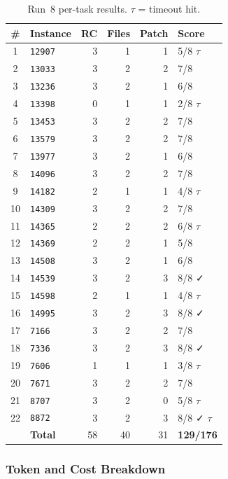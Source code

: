 \begin{table}[h]
\centering
\small
\caption{Run~8 per-task results.  $\tau$ = timeout hit.}\label{tab:r8-tasks}
\setlength{\tabcolsep}{4pt}
\begin{tabular}{clrrrl}
\toprule
\textbf{\#} & \textbf{Instance} & \textbf{RC} & \textbf{Files} & \textbf{Patch} & \textbf{Score} \\
\midrule
 1 & \texttt{12907} & 3 & 1 & 1 & 5/8 $\tau$ \\
 2 & \texttt{13033} & 3 & 2 & 2 & 7/8 \\
 3 & \texttt{13236} & 3 & 2 & 1 & 6/8 \\
 4 & \texttt{13398} & 0 & 1 & 1 & 2/8 $\tau$ \\
 5 & \texttt{13453} & 3 & 2 & 2 & 7/8 \\
 6 & \texttt{13579} & 3 & 2 & 2 & 7/8 \\
 7 & \texttt{13977} & 3 & 2 & 1 & 6/8 \\
 8 & \texttt{14096} & 3 & 2 & 2 & 7/8 \\
 9 & \texttt{14182} & 2 & 1 & 1 & 4/8 $\tau$ \\
10 & \texttt{14309} & 3 & 2 & 2 & 7/8 \\
11 & \texttt{14365} & 2 & 2 & 2 & 6/8 $\tau$ \\
12 & \texttt{14369} & 2 & 2 & 1 & 5/8 \\
13 & \texttt{14508} & 3 & 2 & 1 & 6/8 \\
14 & \texttt{14539} & 3 & 2 & 3 & 8/8 ✓ \\
15 & \texttt{14598} & 2 & 1 & 1 & 4/8 $\tau$ \\
16 & \texttt{14995} & 3 & 2 & 3 & 8/8 ✓ \\
17 & \texttt{7166}  & 3 & 2 & 2 & 7/8 \\
18 & \texttt{7336}  & 3 & 2 & 3 & 8/8 ✓ \\
19 & \texttt{7606}  & 1 & 1 & 1 & 3/8 $\tau$ \\
20 & \texttt{7671}  & 3 & 2 & 2 & 7/8 \\
21 & \texttt{8707}  & 3 & 2 & 0 & 5/8 $\tau$ \\
22 & \texttt{8872}  & 3 & 2 & 3 & 8/8 ✓ $\tau$ \\
\midrule
   & \textbf{Total} & 58 & 40 & 31 & \textbf{129/176} \\
\bottomrule
\end{tabular}
\end{table}

\subsubsection{Token and Cost Breakdown}

